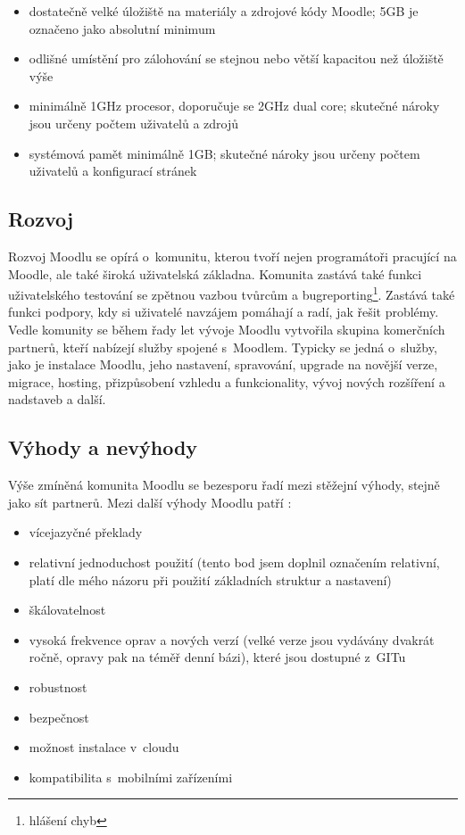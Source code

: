 \documentclass[
print,
  11pt,
  table,   
  nolof,    
  nolot,
  oneside,
  draft
]{fithesis3}
\begin{document}
\begin{itemize}
\item dostatečně velké úložiště na materiály a zdrojové kódy Moodle; 5GB je označeno jako absolutní minimum 
\item odlišné umístění pro zálohování se stejnou nebo větší kapacitou než úložiště výše
\item minimálně 1GHz procesor, doporučuje se 2GHz dual core; skutečné nároky jsou určeny počtem uživatelů a zdrojů
\item systémová pamět minimálně 1GB; skutečné nároky jsou určeny počtem uživatelů a konfigurací stránek
\end{itemize}


		\subsection{Rozvoj}
Rozvoj Moodlu se opírá o~komunitu, kterou tvoří nejen programátoři pracující na Moodle, ale také široká uživatelská základna. Komunita zastává také funkci uživatelského testování se zpětnou vazbou tvůrcům a bugreporting\footnote{hlášení chyb}. Zastává také funkci podpory, kdy si uživatelé navzájem pomáhají a radí, jak řešit problémy. Vedle komunity se během řady let vývoje Moodlu vytvořila skupina komerčních partnerů, kteří nabízejí služby spojené s~Moodlem. Typicky se jedná o~služby, jako je instalace Moodlu, jeho nastavení, spravování, upgrade na novější verze, migrace, hosting, přizpůsobení vzhledu a funkcionality, vývoj nových rozšíření a nadstaveb a další.
		\subsection{Výhody a nevýhody}
Výše zmíněná komunita Moodlu se bezesporu řadí mezi stěžejní výhody, stejně jako sít partnerů. Mezi další výhody Moodlu patří \cite{cooch}:
\begin{itemize}
\item vícejazyčné překlady
\item relativní jednoduchost použití (tento bod jsem doplnil označením relativní, platí dle mého názoru při použití základních struktur a nastavení)
\item škálovatelnost
\item vysoká frekvence oprav a nových verzí (velké verze jsou vydávány dvakrát ročně, opravy pak na téměř denní bázi), které jsou dostupné z~GITu
\item robustnost
\item bezpečnost
\item možnost instalace v~cloudu
\item kompatibilita s~mobilními zařízeními
\end{itemize}
\end{document}
